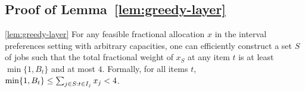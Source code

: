 
\subsection{Proof of Lemma~\ref{lem:greedy-layer}}

\begin{numberedlemma}{\ref{lem:greedy-layer}}
    For any feasible fractional allocation $x$ in the interval preferences
    setting with arbitrary capacities, one can efficiently
    construct a set $S$ of jobs such that the total fractional weight of
    $x_S$ at any item $t$ is at least $\min\{1,B_t\}$ and at most $4$.
    Formally, for all items $t$, $\min\{1,B_t\}\le \sum_{j\in S: t\in
    {I_{j}}} x_j < 4$.
\end{numberedlemma}

